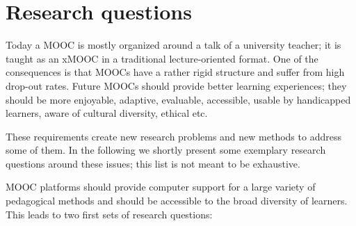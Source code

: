 \section{Research questions}

Today a MOOC  is mostly organized around a talk of a university teacher; it is taught as an xMOOC in a traditional lecture-oriented format. One of the consequences is that MOOCs have a rather rigid structure and suffer from high drop-out rates.  Future MOOCs should provide better learning experiences; they should be more enjoyable, adaptive, evaluable, accessible, usable by handicapped learners, aware of cultural diversity, ethical etc.

These requirements create new research problems and new methods to address some of them. In the following we shortly present some exemplary research questions around these issues; this list is not meant to be exhaustive.  

\medskip
MOOC platforms should provide computer support for a large variety of pedagogical methods and should be accessible to the broad diversity of learners. This leads to two first sets of research questions:


